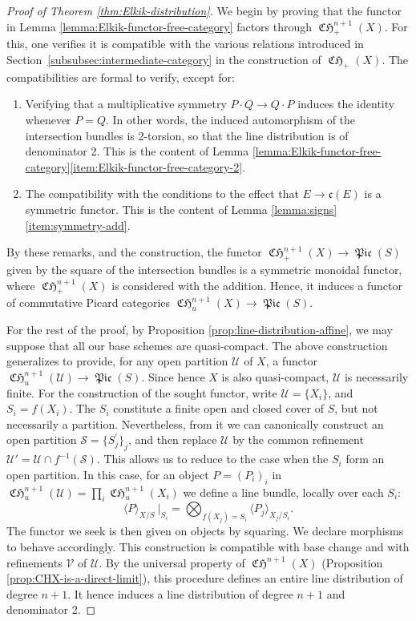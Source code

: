 \documentclass[JEP,XML,SOM,Unicode,published]{cedram}
\theoremstyle{plain}
\theoremstyle{definition}
\newcommand{\Scal}{\mathcal S}
\newcommand{\Ucal}{\mathcal U}
\newcommand{\Vcal}{\mathcal V}
\newcommand{\cfrak}{\mathfrak c}
\DeclareMathOperator{\CHfrak}{\mathfrak{CH}}
\DeclareMathOperator{\Picfr}{\mathfrak{Pic}}
\begin{document}
\begin{proof}[Proof of Theorem \ref{thm:Elkik-distribution}]
We begin by proving that the functor in Lemma \ref{lemma:Elkik-functor-free-category} factors through $\CHfrak_{+}^{n+1}(X)$. For this, one verifies it is compatible with the various relations introduced in Section~\ref{subsubsec:intermediate-category} in the construction of $\CHfrak_{+}(X)$. The compatibilities are formal to verify, except for:
\begin{enumerate}
\item Verifying that a multiplicative symmetry $P\cdot Q\to Q\cdot P$ induces the identity whenever $P = Q$. In other words, the induced automorphism of the intersection bundles is 2-torsion, so that the line distribution is of denominator 2. This is the content of Lemma \ref{lemma:Elkik-functor-free-category}\eqref{item:Elkik-functor-free-category-2}.
\item The compatibility with the conditions to the effect that $E\to\cfrak(E)$ is a symmetric functor. This is the content of Lemma \ref{lemma:signs}\eqref{item:symmetry-add}.
\end{enumerate}
By these remarks, and the construction, the functor $\CHfrak_{+}^{n+1}(X)\to\Picfr(S)$ given by the square of the intersection bundles is a symmetric monoidal functor, where $\CHfrak_{+}^{n+1}(X)$ is considered with the addition. Hence, it induces a functor of commutative Picard categories $\CHfrak_{u}^{n+1}(X)\to\Picfr(S)$.

For the rest of the proof, by Proposition \ref{prop:line-distribution-affine}, we may suppose that all our base schemes are quasi-compact. The above construction generalizes to provide, for any open partition $\Ucal$ of $X$, a functor $\CHfrak_{u}^{n+1}(\Ucal)\to\Picfr(S)$. Since hence $X$ is also quasi-compact, $\Ucal$ is necessarily finite. For the construction of the sought functor, write $\Ucal=\lbrace X_{i}\rbrace$, and $S_{i}=f(X_{i})$. The $S_{i}$ constitute a finite open and closed cover of $S$, but not necessarily a partition. Nevertheless, from it we can canonically construct an open partition $\Scal = \lbrace S_{j}^{\prime}\rbrace_{j}$, and then replace $\Ucal$ by the common refinement $\Ucal'=\Ucal \cap f^{-1}(\Scal)$. This allows us to reduce to the case when the $S_{i}$ form an open partition. In this case, for an object $P=(P_{i})_i$ in $\CHfrak_{u}^{n+1}(\Ucal)=\prod_{i}\CHfrak_{u}^{n+1}(X_{i})$ we define a line bundle, locally over each $S_{i}$:
\begin{displaymath}
\langle P \rangle_{X/S}\ |_{S_{i}} = \bigotimes_{f(X_{j}) = S_{i} } \langle P_{j}\rangle_{X_{j}/S_{i}}.
\end{displaymath}
The functor we seek is then given on objects by squaring. We declare morphisms to behave accordingly. This construction is compatible with base change and with refinements $\Vcal$ of $\Ucal$. By the universal property of $\CHfrak^{n+1}(X)$ (\cf Proposition \ref{prop:CHX-is-a-direct-limit}), this procedure defines an entire line distribution of degree $n+1$. It hence induces a line distribution of degree $n+1$ and denominator 2.
\end{proof}
\end{document}
